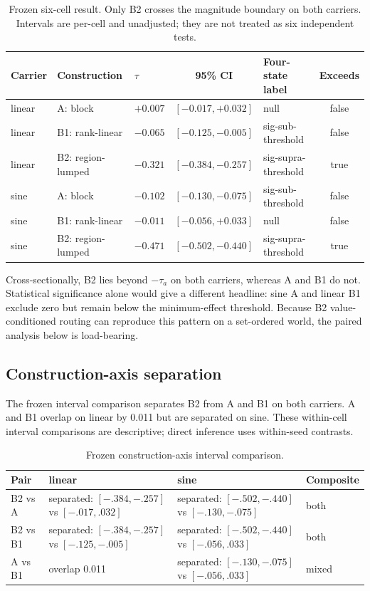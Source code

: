 \documentclass{article}
\begin{document}
\begin{table}[t]
\centering\footnotesize
\caption{Frozen six-cell result. Only B2 crosses the magnitude boundary on both carriers. Intervals
are per-cell and unadjusted; they are not treated as six independent tests.}
\label{tab:six-cell}
\setlength{\tabcolsep}{3.5pt}
\begin{tabular}{lllclc}
\toprule
Carrier & Construction & $\tau$ & 95\% CI & Four-state label & Exceeds \\
\midrule
linear & A: block & $+0.007$ & $[-0.017,+0.032]$ & null & false \\
linear & B1: rank-linear & $-0.065$ & $[-0.125,-0.005]$ & sig-sub-threshold & false \\
linear & B2: region-lumped & $-0.321$ & $[-0.384,-0.257]$ & sig-supra-threshold & true \\
sine & A: block & $-0.102$ & $[-0.130,-0.075]$ & sig-sub-threshold & false \\
sine & B1: rank-linear & $-0.011$ & $[-0.056,+0.033]$ & null & false \\
sine & B2: region-lumped & $-0.471$ & $[-0.502,-0.440]$ & sig-supra-threshold & true \\
\bottomrule
\end{tabular}
\end{table}

Cross-sectionally, B2 lies beyond $-\tau_a$ on both carriers, whereas A and B1 do not. Statistical
significance alone would give a different headline: sine A and linear B1 exclude zero but remain
below the minimum-effect threshold. Because B2 value-conditioned routing can reproduce this pattern
on a set-ordered world, the paired analysis below is load-bearing.

\subsection{Construction-axis separation}
The frozen interval comparison separates B2 from A and B1 on both carriers. A and B1 overlap on
linear by 0.011 but are separated on sine. These within-cell interval comparisons are descriptive;
direct inference uses within-seed contrasts.

\begin{table}[t]
\centering\scriptsize
\caption{Frozen construction-axis interval comparison.}
\label{tab:axis}
\begin{tabularx}{\linewidth}{@{}lXXX@{}}
\toprule
Pair & linear & sine & Composite \\
\midrule
B2 vs A & separated: $[-.384,-.257]$ vs $[-.017,.032]$ & separated: $[-.502,-.440]$ vs $[-.130,-.075]$ & both \\
B2 vs B1 & separated: $[-.384,-.257]$ vs $[-.125,-.005]$ & separated: $[-.502,-.440]$ vs $[-.056,.033]$ & both \\
A vs B1 & overlap 0.011 & separated: $[-.130,-.075]$ vs $[-.056,.033]$ & mixed \\
\bottomrule
\end{tabularx}
\end{table}
\end{document}
